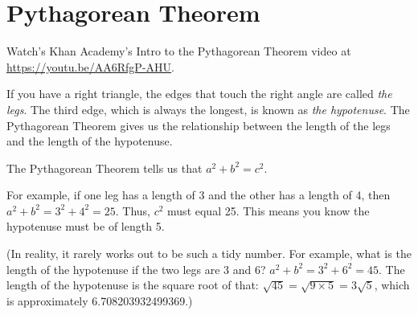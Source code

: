 \chapter{Pythagorean Theorem}

Watch's Khan Academy's Intro to the Pythagorean Theorem video at \url{https://youtu.be/AA6RfgP-AHU}.

If you have a right triangle, the edges that touch the right angle are
called \emph{the legs}.  The third edge, which is always the longest,
is known as \emph{the hypotenuse}. The Pythagorean Theorem gives us
the relationship between the length of the legs and the length of the
hypotenuse.


The Pythagorean Theorem tells us that $a^2 + b^2 = c^2$.

For example, if one leg has a length of 3 and the other has a length of 4, then
$a^2 + b^2 = 3^2 + 4^2 = 25$. Thus, $c^2$ must equal 25. This means you know
the hypotenuse must be of length 5.

(In reality, it rarely works out to be such a tidy number. For
example, what is the length of the hypotenuse if the two legs are 3
and 6? $a^2 + b^2 = 3^2 + 6^2 = 45$.  The length of the hypotenuse is
the square root of that: $\sqrt{45} = \sqrt{9 \times 5} = 3 \sqrt{5}$,
which is approximately 6.708203932499369.)

